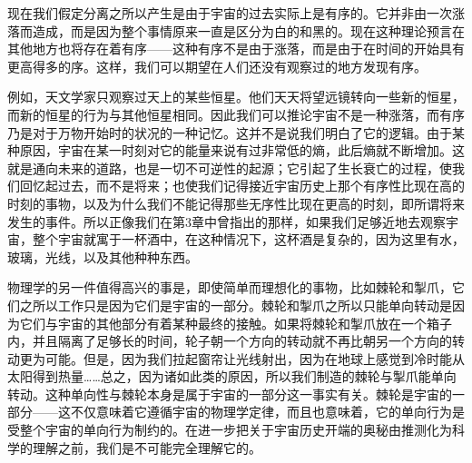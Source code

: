 现在我们假定分离之所以产生是由于宇宙的过去实际上是有序的。它并非由一次涨落而造成，而是因为整个事情原来一直是区分为白的和黑的。现在这种理论预言在其他地方也将存在着有序——这种有序不是由于涨落，而是由于在时间的开始具有更高得多的序。这样，我们可以期望在人们还没有观察过的地方发现有序。

例如，天文学家只观察过天上的某些恒星。他们天天将望远镜转向一些新的恒星，而新的恒星的行为与其他恒星相同。因此我们可以推论宇宙不是一种涨落，而有序乃是对于万物开始时的状况的一种记忆。这并不是说我们明白了它的逻辑。由于某种原因，宇宙在某一时刻对它的能量来说有过非常低的熵，此后熵就不断增加。这就是通向未来的道路，也是一切不可逆性的起源；它引起了生长衰亡的过程，使我们回忆起过去，而不是将来；也使我们记得接近宇宙历史上那个有序性比现在高的时刻的事物，以及为什么我们不能记得那些无序性比现在更高的时刻，即所谓将来发生的事件。所以正像我们在第3章中曾指出的那样，如果我们足够近地去观察宇宙，整个宇宙就寓于一杯酒中，在这种情况下，这杯酒是复杂的，因为这里有水，玻璃，光线，以及其他种种东西。

物理学的另一件值得高兴的事是，即使简单而理想化的事物，比如棘轮和掣爪，它们之所以工作只是因为它们是宇宙的一部分。棘轮和掣爪之所以只能单向转动是因为它们与宇宙的其他部分有着某种最终的接触。如果将棘轮和掣爪放在一个箱子内，并且隔离了足够长的时间，轮子朝一个方向的转动就不再比朝另一个方向的转动更为可能。但是，因为我们拉起窗帘让光线射出，因为在地球上感觉到冷时能从太阳得到热量……总之，因为诸如此类的原因，所以我们制造的棘轮与掣爪能单向转动。这种单向性与棘轮本身是属于宇宙的一部分这一事实有关。棘轮是宇宙的一部分——这不仅意味着它遵循宇宙的物理学定律，而且也意味着，它的单向行为是受整个宇宙的单向行为制约的。在进一步把关于宇宙历史开端的奥秘由推测化为科学的理解之前，我们是不可能完全理解它的。